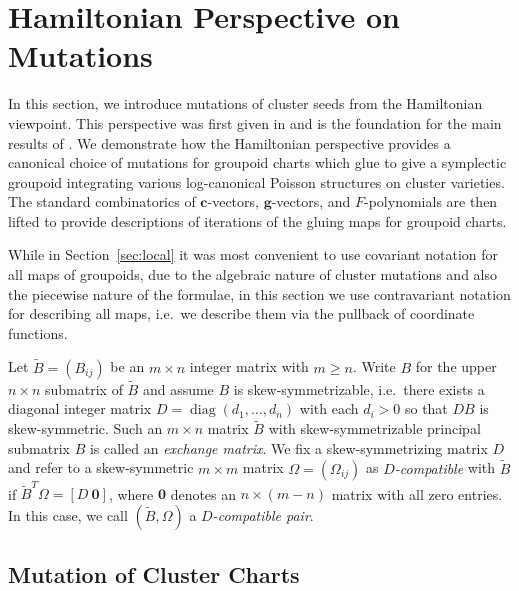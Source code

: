 \documentclass{amsart}
\numberwithin{equation}{section}
\newcommand{\bfc}{\mathbf{c}}
\newcommand{\bfg}{\mathbf{g}}
\newcommand{\diag}{\operatorname{diag}}
\begin{document}
\section{Hamiltonian Perspective on Mutations}
\label{sec:mutations}

In this section, we introduce mutations of cluster seeds from the Hamiltonian viewpoint.
This perspective was first given in \cite{FG09c} and is the foundation for the main results of \cite{MR3691969}.
We demonstrate how the Hamiltonian perspective provides a canonical choice of mutations for groupoid charts which glue to give a symplectic groupoid integrating various log-canonical Poisson structures on cluster varieties.
The standard combinatorics of $\bfc$-vectors, $\bfg$-vectors, and $F$-polynomials are then lifted to provide descriptions of iterations of the gluing maps for groupoid charts.

While in Section~\ref{sec:local} it was most convenient to use covariant notation for all maps of groupoids, due to the algebraic nature of cluster mutations and also the piecewise nature of the formulae, in this section we use contravariant notation for describing all maps, i.e.\ we describe them via the pullback of coordinate functions.

Let $\tilde B=(B_{ij})$ be an $m\times n$ integer matrix with $m\ge n$.  
Write $B$ for the upper $n\times n$ submatrix of $\tilde B$ and assume $B$ is skew-symmetrizable, i.e.\ there exists a diagonal integer matrix $D=\diag(d_1,\ldots,d_n)$ with each $d_i>0$ so that $DB$ is skew-symmetric. 
Such an $m\times n$ matrix $\tilde B$ with skew-symmetrizable principal submatrix $B$ is called an \emph{exchange matrix}.
We fix a skew-symmetrizing matrix $D$ and refer to a skew-symmetric $m\times m$ matrix $\Omega=(\Omega_{ij})$ as \emph{$D$-compatible} with $\tilde B$ if $\tilde B^T\Omega=[D\ \boldsymbol{0}]$, where $\boldsymbol{0}$ denotes an $n\times(m-n)$ matrix with all zero entries.
In this case, we call $(\tilde B,\Omega)$ a \emph{$D$-compatible pair}.

\subsection{Mutation of Cluster Charts}
\label{sec:cluster}
\end{document}
